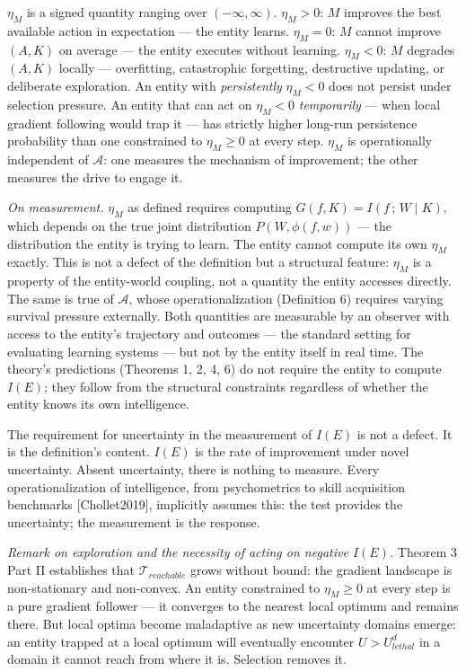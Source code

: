 \documentclass[
]{article}
\begin{document}
\(\eta_M\) is a signed quantity ranging over \((-\infty, \infty)\).
\(\eta_M > 0\): \(M\) improves the best available action in expectation
--- the entity learns. \(\eta_M = 0\): \(M\) cannot improve \((A, K)\)
on average --- the entity executes without learning. \(\eta_M < 0\):
\(M\) degrades \((A, K)\) locally --- overfitting, catastrophic
forgetting, destructive updating, or deliberate exploration. An entity
with \emph{persistently} \(\eta_M < 0\) does not persist under selection
pressure. An entity that can act on \(\eta_M < 0\) \emph{temporarily}
--- when local gradient following would trap it --- has strictly higher
long-run persistence probability than one constrained to
\(\eta_M \geq 0\) at every step. \(\eta_M\) is operationally independent
of \(\mathcal{A}\): one measures the mechanism of improvement; the other
measures the drive to engage it.

\emph{On measurement.} \(\eta_M\) as defined requires computing
\(G(f, K) = I(f\,;\, W \mid K)\), which depends on the true joint
distribution \(P(W, \phi(f,w))\) --- the distribution the entity is
trying to learn. The entity cannot compute its own \(\eta_M\) exactly.
This is not a defect of the definition but a structural feature:
\(\eta_M\) is a property of the entity-world coupling, not a quantity
the entity accesses directly. The same is true of \(\mathcal{A}\), whose
operationalization (Definition 6) requires varying survival pressure
externally. Both quantities are measurable by an observer with access to
the entity's trajectory and outcomes --- the standard setting for
evaluating learning systems --- but not by the entity itself in real
time. The theory's predictions (Theorems 1, 2, 4, 6) do not require
the entity to compute \(I(E)\); they follow from the structural
constraints regardless of whether the entity knows its own intelligence.

The requirement for uncertainty in the measurement of \(I(E)\) is not a
defect. It is the definition's content. \(I(E)\) is the rate of
improvement under novel uncertainty. Absent uncertainty, there is
nothing to measure. Every operationalization of intelligence, from
psychometrics to skill acquisition benchmarks {[}Chollet2019{]},
implicitly assumes this: the test provides the uncertainty; the
measurement is the response.

\emph{Remark on exploration and the necessity of acting on negative
\(I(E)\).} Theorem 3 Part II establishes that
\(\mathcal{T}_{reachable}\) grows without bound: the gradient landscape
is non-stationary and non-convex. An entity constrained to
\(\eta_M \geq 0\) at every step is a pure gradient follower --- it
converges to the nearest local optimum and remains there. But local
optima become maladaptive as new uncertainty domains emerge: an entity
trapped at a local optimum will eventually encounter
\(U > U_{lethal}^d\) in a domain it cannot reach from where it is.
Selection removes it.
\end{document}

